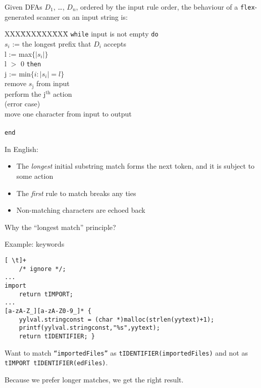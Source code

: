 \begin{slide*}
Given DFAs $D_1$, \ldots, $D_n$, ordered by the input rule order,
the behaviour of a {\tt flex}-generated scanner on an input string is:

\vspace{0.1in}

\begin{small}
\begin{tabbing}
XXX\=XXX\=XXX\=XXX\=\kill
{\tt while} input is not empty {\tt do}\\
\>$s_i$ := the longest prefix that $D_i$ accepts\\
\>l := max$\{ |s_i| \}$\\
 l $>$ 0 {\tt then}\\
\>\>j := min$\{ i: |s_i|=l \}$\\
\>\>remove $s_{\mbox{j}}$ from input\\
\>\>perform the j$^{\mathrm{th}}$ action\\
 (error case)\\
\>\>move one character from input to output\\
\\
{\tt end}
\end{tabbing}
\end{small}

\vspace{0.1in}

In English:
\begin{itemize}
\item The {\em longest} initial substring match forms the next token,
  and it is subject to some action
\item The {\em first} rule to match breaks any ties
\item Non-matching characters are echoed back
\end{itemize}

\vfil
\end{slide*}

\begin{slide*}
Why the ``longest match'' principle?

Example: keywords\\[2ex]

{\scriptsize
\begin{verbatim}
[ \t]+
    /* ignore */;
...
import
    return tIMPORT;
...
[a-zA-Z_][a-zA-Z0-9_]* {
    yylval.stringconst = (char *)malloc(strlen(yytext)+1);
    printf(yylval.stringconst,"%s",yytext); 
    return tIDENTIFIER; } 
\end{verbatim}
}

Want to match {\tt ``importedFiles''} as \mbox{{\tt tIDENTIFIER(importedFiles)}}
and not as \mbox{{\tt tIMPORT tIDENTIFIER(edFiles)}}.

Because we prefer longer matches, we get the right result.

\vfil
\end{slide*}

